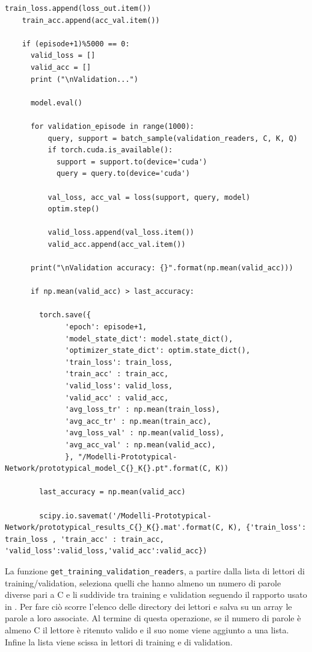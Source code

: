 \documentclass[12pt,a4paper,titlepage]{article}
\begin{document}
\begin{lstlisting}[language=iPython,firstnumber=1, caption=protonet\_training.py, label=protonet_training main,captionpos=b]
    train_loss.append(loss_out.item())
    train_acc.append(acc_val.item())
    
    if (episode+1)%5000 == 0:
      valid_loss = []
      valid_acc = []
      print ("\nValidation...")

      model.eval()

      for validation_episode in range(1000):
          query, support = batch_sample(validation_readers, C, K, Q)
          if torch.cuda.is_available():
            support = support.to(device='cuda')
            query = query.to(device='cuda')
          
          val_loss, acc_val = loss(support, query, model)
          optim.step()
          
          valid_loss.append(val_loss.item())
          valid_acc.append(acc_val.item())

      print("\nValidation accuracy: {}".format(np.mean(valid_acc)))

      if np.mean(valid_acc) > last_accuracy: 

        torch.save({
              'epoch': episode+1,
              'model_state_dict': model.state_dict(),
              'optimizer_state_dict': optim.state_dict(),
              'train_loss': train_loss,
              'train_acc' : train_acc,              
              'valid_loss': valid_loss,
              'valid_acc' : valid_acc,
              'avg_loss_tr' : np.mean(train_loss),
              'avg_acc_tr' : np.mean(train_acc),
              'avg_loss_val' : np.mean(valid_loss),
              'avg_acc_val' : np.mean(valid_acc),
              }, "/Modelli-Prototypical-Network/prototypical_model_C{}_K{}.pt".format(C, K))
        
        last_accuracy = np.mean(valid_acc)

        scipy.io.savemat('/Modelli-Prototypical-Network/prototypical_results_C{}_K{}.mat'.format(C, K), {'train_loss': train_loss , 'train_acc' : train_acc, 'valid_loss':valid_loss,'valid_acc':valid_acc})
\end{lstlisting}

La funzione \texttt{get\_training\_validation\_readers}, a partire dalla lista di lettori di training/validation, seleziona quelli che hanno almeno un numero di parole diverse pari a C e li suddivide tra training e validation seguendo il rapporto usato in \cite{Salamon:Few-Shot}.
Per fare ciò scorre l'elenco delle directory dei lettori e salva su un array le parole a loro associate. Al termine di questa operazione, se il numero di parole è almeno C il lettore è ritenuto valido e il suo nome viene aggiunto a una lista. Infine la lista viene scissa in lettori di training e di validation. 
\end{document}
